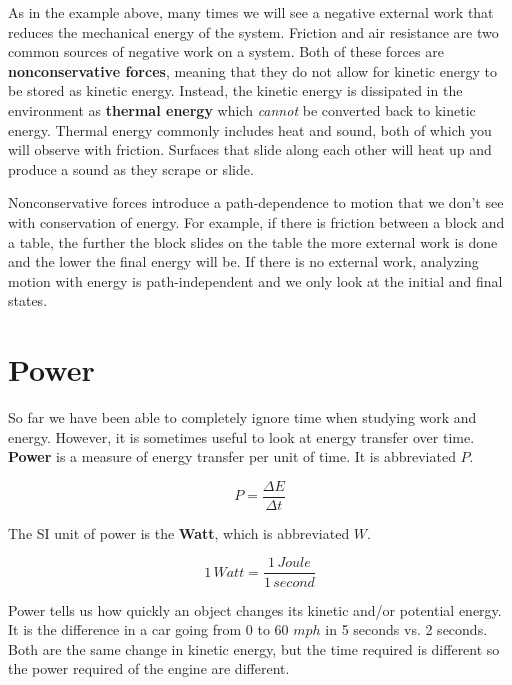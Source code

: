 \documentclass[12pt]{book}
\begin{document}
As in the example above, many times we will see a negative external work that reduces the mechanical energy of the system. Friction and air resistance are two common sources of negative work on a system. Both of these forces are \textbf{nonconservative forces}, meaning that they do not allow for kinetic energy to be stored as kinetic energy. Instead, the kinetic energy is dissipated in the environment as \textbf{thermal energy} which \textit{cannot} be converted back to kinetic energy. Thermal energy commonly includes heat and sound, both of which you will observe with friction. Surfaces that slide along each other will heat up and produce a sound as they scrape or slide.

Nonconservative forces introduce a path-dependence to motion that we don't see with conservation of energy. For example, if there is friction between a block and a table, the further the block slides on the table the more external work is done and the lower the final energy will be. If there is no external work, analyzing motion with energy is path-independent and we only look at the initial and final states.

\section{Power}

So far we have been able to completely ignore time when studying work and energy. However, it is sometimes useful to look at energy transfer over time. \textbf{Power} is a measure of energy transfer per unit of time. It is abbreviated $P$.

\begin{equation}
P = \frac{\Delta E}{\Delta t}
\label{power}
\end{equation}

 The SI unit of power is the \textbf{Watt}, which is abbreviated $W$.

\begin{equation}
1 \, Watt = \frac{1 \, Joule}{1 \, second}
\end{equation}

Power tells us how quickly an object changes its kinetic and/or potential energy. It is the difference in a car going from 0 to 60 $mph$ in 5 seconds vs. 2 seconds. Both are the same change in kinetic energy, but the time required is different so the power required of the engine are different.
\end{document}
